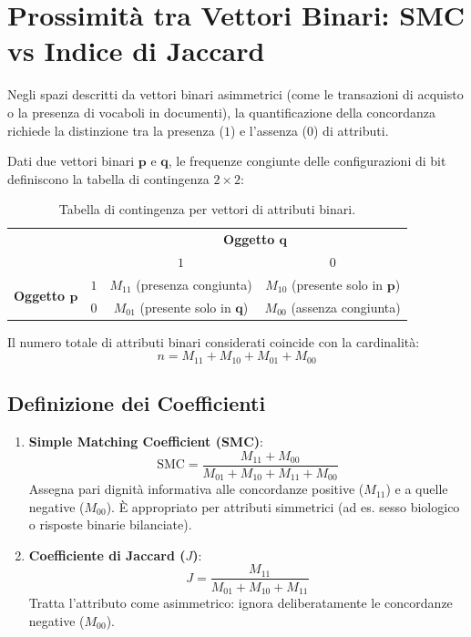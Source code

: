 \section{Prossimità tra Vettori Binari: SMC vs Indice di Jaccard}
\label{sec:dm-binary-proximity-jaccard}

Negli spazi descritti da vettori binari asimmetrici (come le transazioni di acquisto o la presenza di vocaboli in documenti), la quantificazione della concordanza richiede la distinzione tra la presenza ($1$) e l'assenza ($0$) di attributi.

Dati due vettori binari $\mathbf{p}$ e $\mathbf{q}$, le frequenze congiunte delle configurazioni di bit definiscono la tabella di contingenza $2 \times 2$:
\begin{table}[H]
\centering
\small
\begin{tabular}{cc|cc}
\toprule
& & \multicolumn{2}{c}{\textbf{Oggetto $\mathbf{q}$}} \\
& & $1$ & $0$ \\
\midrule
\multirow{2}{*}{\textbf{Oggetto $\mathbf{p}$}} & $1$ & $M_{11}$ (presenza congiunta) & $M_{10}$ (presente solo in $\mathbf{p}$) \\
& $0$ & $M_{01}$ (presente solo in $\mathbf{q}$) & $M_{00}$ (assenza congiunta) \\
\bottomrule
\end{tabular}
\caption{Tabella di contingenza per vettori di attributi binari.}
\label{tab:dm-contingency-binary}
\end{table}

Il numero totale di attributi binari considerati coincide con la cardinalità:
\begin{equation}
    n = M_{11} + M_{10} + M_{01} + M_{00}
\end{equation}

\FloatBarrier
\subsection{Definizione dei Coefficienti}
\begin{enumerate}
    \item \textbf{Simple Matching Coefficient (SMC)}:
    \begin{equation}
        \text{SMC} = \frac{M_{11} + M_{00}}{M_{01} + M_{10} + M_{11} + M_{00}}
    \end{equation}
    Assegna pari dignità informativa alle concordanze positive ($M_{11}$) e a quelle negative ($M_{00}$). È appropriato per attributi simmetrici (ad es. sesso biologico o risposte binarie bilanciate).
    \item \textbf{Coefficiente di Jaccard ($J$)}:
    \begin{equation}
        J = \frac{M_{11}}{M_{01} + M_{10} + M_{11}}
    \end{equation}
    Tratta l'attributo come asimmetrico: ignora deliberatamente le concordanze negative ($M_{00}$).
\end{enumerate}

